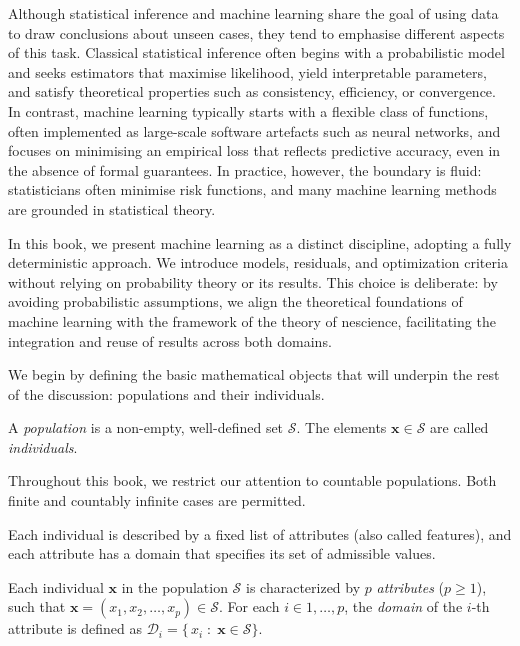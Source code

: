 Although statistical inference and machine learning share the goal of using data to draw conclusions about unseen cases, they tend to emphasise different aspects of this task. Classical statistical inference often begins with a probabilistic model and seeks estimators that maximise likelihood, yield interpretable parameters, and satisfy theoretical properties such as consistency, efficiency, or convergence. In contrast, machine learning typically starts with a flexible class of functions, often implemented as large-scale software artefacts such as neural networks, and focuses on minimising an empirical loss that reflects predictive accuracy, even in the absence of formal guarantees. In practice, however, the boundary is fluid: statisticians often minimise risk functions, and many machine learning methods are grounded in statistical theory.

In this book, we present machine learning as a distinct discipline, adopting a fully deterministic approach. We introduce models, residuals, and optimization criteria without relying on probability theory or its results. This choice is deliberate: by avoiding probabilistic assumptions, we align the theoretical foundations of machine learning with the framework of the theory of nescience, facilitating the integration and reuse of results across both domains.

We begin by defining the basic mathematical objects that will underpin the rest of the discussion: populations and their individuals.

\begin{definition}
A \emph{population} is a non-empty, well-defined set $\mathcal{S}$. The elements $\mathbf{x}\in\mathcal{S}$ are called \emph{individuals}.
\end{definition}

Throughout this book, we restrict our attention to countable populations. Both finite and countably infinite cases are permitted.

Each individual is described by a fixed list of attributes (also called features), and each attribute has a domain that specifies its set of admissible values.

\begin{definition}
Each individual $\mathbf{x}$ in the population $\mathcal{S}$ is characterized by $p$ \emph{attributes} ($p \ge 1$), such that $\mathbf{x} = (x_{1}, x_{2}, \dots, x_{p}) \in \mathcal{S}$. For each $i \in {1, \dots, p}$, the \emph{domain} of the $i$-th attribute is defined as $\mathcal{D}_{i} = \{\,x_{i}\;:\;\mathbf{x}\in\mathcal{S}\}$.
\end{definition}

